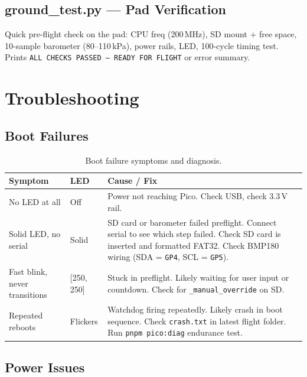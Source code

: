 \documentclass[11pt, a4paper, twoside]{article}
\newcommand{\pin}[1]{\texttt{GP#1}}
\newcommand{\file}[1]{\texttt{#1}}
\begin{document}
\subsection{ground\_test.py --- Pad Verification}
\label{sec:groundtest}

Quick pre-flight check on the pad: CPU freq (200\,MHz), SD mount + free space, 10-sample barometer (80--110\,kPa), power rails, LED, 100-cycle timing test. Prints \texttt{ALL CHECKS PASSED --- READY FOR FLIGHT} or error summary.

\section{Troubleshooting}
\label{sec:troubleshooting}

\subsection{Boot Failures}

\begin{table}[ht]
\centering
\small
\caption{Boot failure symptoms and diagnosis.}
\label{tab:boot-failures}
\begin{tabularx}{\textwidth}{l l X}
\toprule
\textbf{Symptom} & \textbf{LED} & \textbf{Cause / Fix} \\
\midrule
No LED at all & Off & Power not reaching Pico. Check USB, check 3.3\,V rail. \\
Solid LED, no serial & Solid & SD card or barometer failed preflight. Connect serial to see which step failed. Check SD card is inserted and formatted FAT32. Check BMP180 wiring (SDA = \pin{4}, SCL = \pin{5}). \\
Fast blink, never transitions & [250, 250] & Stuck in preflight. Likely waiting for user input or countdown. Check for \file{\_manual\_override} on SD. \\
Repeated reboots & Flickers & Watchdog firing repeatedly. Likely crash in boot sequence. Check \file{crash.txt} in latest flight folder. Run \texttt{pnpm pico:diag} endurance test. \\
\bottomrule
\end{tabularx}
\end{table}

\subsection{Power Issues}
\label{sec:troubleshooting-power}
\end{document}
